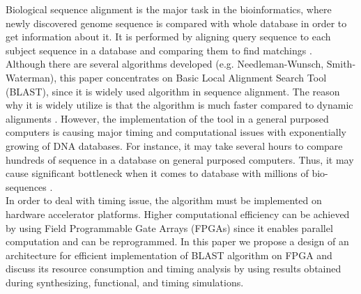 Biological sequence alignment is the major task in the bioinformatics, where newly discovered genome sequence is compared with whole database in order to get information about it. It is performed by aligning query sequence to each subject sequence in a database and comparing them to find matchings \cite{guo2012systolic}.
\\
Although there are several algorithms developed (e.g. Needleman-Wunsch, Smith-Waterman), this paper concentrates on Basic Local Alignment Search Tool (BLAST), since it is widely used algorithm in sequence alignment. The reason why it is widely utilize is that the algorithm is much faster compared to dynamic alignments \cite{kasap2008design}. However, the implementation of the tool in a general purposed computers is causing major timing and computational issues with exponentially growing of DNA databases. For instance, it may take several hours to compare hundreds of sequence in a database on general purposed computers. Thus, it may cause significant bottleneck when it comes to database with millions of bio-sequences \cite{sarkar2010hardware}.
\\
In order to deal with timing issue, the algorithm must be implemented on hardware accelerator platforms. Higher computational efficiency can be achieved by using Field Programmable Gate Arrays (FPGAs) since it enables parallel computation and can be reprogrammed. In this paper we propose a design of an architecture for efficient implementation of BLAST algorithm on FPGA and discuss its resource consumption and timing analysis by using results obtained during synthesizing, functional, and timing simulations. 

